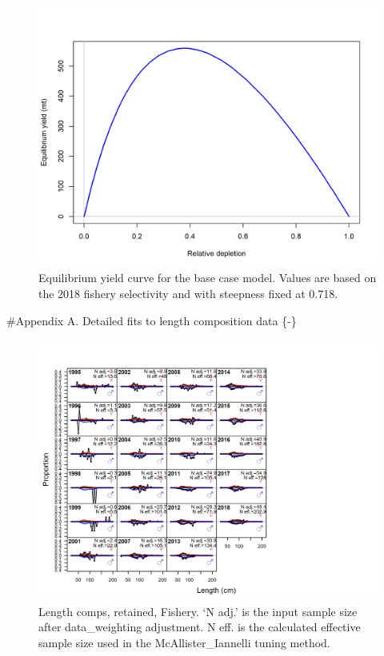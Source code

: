 \documentclass[12pt,]{article}
\begin{document}
\begin{figure}
\centering
\includegraphics{r4ss/plots_mod1/yield1_yield_curve.png}
\caption{Equilibrium yield curve for the base case model. Values are
based on the 2018 fishery selectivity and with steepness fixed at 0.718.
\label{fig:yield1_yield_curve}}
\end{figure}

\FloatBarrier

\newpage

\FloatBarrier
\newpage

\#Appendix A. Detailed fits to length composition data \{-\}
\renewcommand{\thepage}{A-\arabic{page}}

\renewcommand{\thefigure}{A\arabic{figure}}
\setcounter{page}{1}

\begin{figure}
\centering
\includegraphics{./r4ss/plots_mod1/comp_lenfit_flt1mkt2.png}
\caption{Length comps, retained, Fishery. `N adj.' is the input sample
size after data\_weighting adjustment. N eff. is the calculated
effective sample size used in the McAllister\_Iannelli tuning method.
\label{fig:mod1_1_comp_lenfit_flt1mkt2}}
\end{figure}
\end{document}
